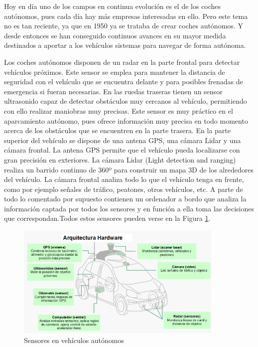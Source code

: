 Hoy en día uno de los campos en continua evolución es el de los coches autónomos, pues cada día hay más empresas interesadas en ello. Pero este tema no es tan reciente, ya que en 1950 ya se trataba de crear coches autónomos. Y desde entonces se han conseguido continuos avances en su mayor medida destinados a aportar a los vehículos sistemas para navegar de forma autónoma.

Los coches autónomos disponen de un radar en la parte frontal para detectar vehículos próximos. Este sensor se emplea para mantener la distancia de seguridad con el vehículo que se encuentra delante y para posibles frenadas de emergencia si fueran necesarias. En las ruedas traseras tienen un sensor ultrasonido capaz de detectar obstáculos muy cercanos al vehículo, permitiendo con ello realizar maniobras muy precisas. Este sensor es muy práctico en el aparcamiento autónomo, pues ofrece información muy precisa en todo momento acerca de los obstáculos que se encuentren en la parte trasera. En la parte superior del vehículo se dispone de una antena GPS, una cámara Lidar y una cámara frontal. La antena GPS permite que el vehículo pueda localizarse con gran precisión en exteriores. La cámara Lidar (Light detection and ranging) realiza un barrido continuo de 360º para construir un mapa 3D de los alrededores del vehículo. La cámara frontal analiza todo lo que el vehículo tenga en frente, como por ejemplo señales de tráfico, peatones, otros vehículos, etc. A parte de todo lo comentado por supuesto contienen un ordenador a bordo que analiza la información captada por todos los sensores y en función a ella toma las decisiones que correspondan.Todos estos sensores pueden verse en la Figura \ref{fig.coche_autonomo}.

\begin{figure}[H]
  \begin{center}
    \includegraphics[width=0.9\textwidth]{figures/Introduccion/coche_autonomo.png}
		\caption{ Sensores en vehículos autónomos}
		\label{fig.coche_autonomo}
		\end{center}
\end{figure}

